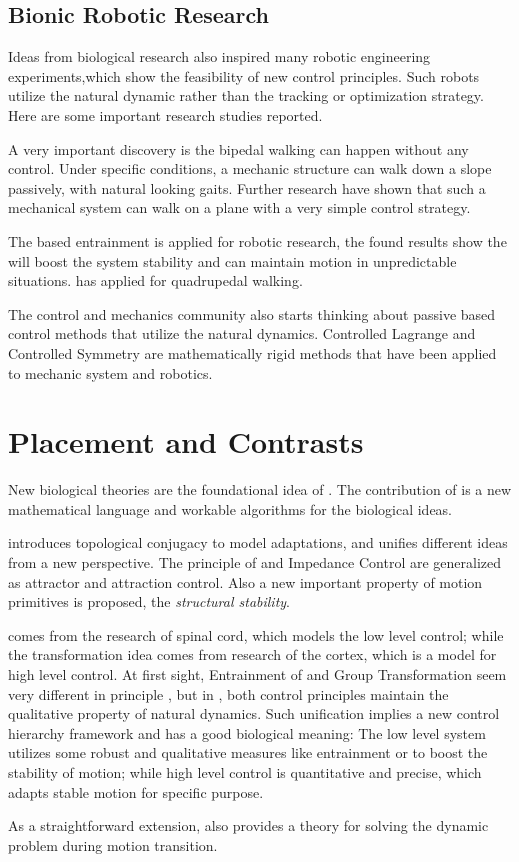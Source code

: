 \subsection{Bionic Robotic Research}
Ideas from biological research  also inspired many robotic engineering experiments,which show the feasibility of new control principles.
Such robots utilize the natural dynamic rather than the tracking or optimization strategy.
Here are some important research studies reported.
\begin{itemize}
A very important discovery is the bipedal walking can happen without any control\citep{McGeer1990}.  
Under specific conditions, a mechanic structure can walk down a slope passively, with natural looking gaits.
Further research have shown that such a mechanical system can walk on a plane with a very simple control strategy\citep{Collins2005}.

The \cpg based entrainment is applied for robotic research\citep{Williamson1999a}, the found results show the \cpg will boost the system stability and can maintain motion in unpredictable situations.
\citet{fukuoka2003adaptive} has applied \cpg for quadrupedal walking.

The control and mechanics community also starts thinking about passive based control methods that utilize the natural dynamics.
Controlled Lagrange \citep{bloch2000controlled,bloch2001controlled,bloch2000potential}and Controlled Symmetry \citep{spong1998underactuated,Spong96energybased} are mathematically rigid methods that have been applied to mechanic system and robotics\citep{spong2005controlled}.
\end{itemize}

\section{Placement and Contrasts}
New biological theories are the foundational idea of \moit.
The contribution of \moit is a new mathematical language and workable algorithms for the biological ideas.

\moit introduces topological conjugacy to model adaptations,   and unifies different ideas from a new  perspective.
The principle of \eph and Impedance Control are generalized as attractor and attraction control.
Also a new important property of  motion primitives is proposed, the \emph{structural stability}.


\cpg comes from the research of spinal cord, which models the low level control; while the transformation idea comes from research of the cortex, which is a model for high level control.
At first sight, Entrainment of \cpg and Group Transformation seem very different in principle , but  in \moit, both control principles maintain the qualitative property of natural dynamics.
Such unification implies a new control hierarchy framework and has a good biological meaning: 
The low level system utilizes some robust and qualitative measures like entrainment or \cpg to boost the stability of motion;
while high level control is quantitative and  precise, which adapts stable motion for specific purpose.

As a straightforward extension, \moit also provides a theory for solving the dynamic problem during motion transition.


 

 



